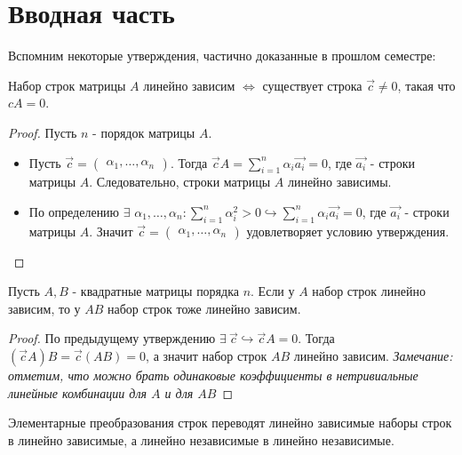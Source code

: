 \section{Вводная часть}                     %
Вспомним некоторые утверждения, частично доказанные в прошлом семестре:
\begin{proposition}
    Набор строк матрицы $A$ линейно зависим $\Leftrightarrow$ существует строка $\vec{c}\neq 0$, такая что $cA=0$.
\end{proposition}
\begin{proof}
    Пусть $n$ - порядок матрицы $A$.
    \begin{itemize}
        \item[$\Leftarrow$] Пусть $\vec{c}=\begin{pmatrix} \alpha_1, \dots, \alpha_n\end{pmatrix}$. Тогда $\vec{c}A=\sum_{i=1}^{n} \alpha_i \vec{a_i}=0$, где $\vec{a_i}$ - строки матрицы $A$. Следовательно, строки матрицы $A$ линейно зависимы.
        \item[$\Rightarrow$] По определению $\exists$ $\alpha_1, \dots, \alpha_n:\sum_{i=1}^{n} \alpha_i^2 >0 \hookrightarrow \sum_{i=1}^{n} \alpha_i \vec{a_i}=0$, где $\vec{a_i}$ - строки матрицы $A$. Значит $\vec{c}=\begin{pmatrix} \alpha_1, \dots, \alpha_n\end{pmatrix}$ удовлетворяет условию утверждения.
    \end{itemize}
\end{proof}
\begin{proposition}
    Пусть $A, B$ - квадратные матрицы порядка $n$. Если у $A$ набор строк линейно зависим, то у $AB$ набор строк тоже линейно зависим.
\end{proposition}
\begin{proof}
    По предыдущему утверждению $\exists \ \vec{c}\hookrightarrow \vec{c}A=0$. Тогда $(\vec{c}A)B=\vec{c}(AB)=0$, а значит набор строк $AB$ линейно зависим. \textit{Замечание: отметим, что можно брать одинаковые коэффициенты в нетривиальные линейные комбинации для $A$ и для $AB$}
\end{proof}
\begin{proposition}
    Элементарные преобразования строк переводят линейно зависимые наборы строк в линейно зависимые, а линейно независимые в линейно независимые.
\end{proposition}
